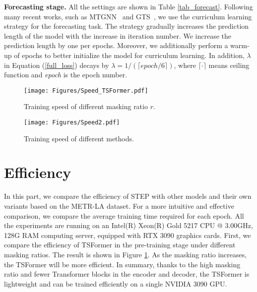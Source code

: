 \documentclass[sigconf]{acmart}
\begin{document}
\noindent \textbf{Forecasting stage.} 
All the settings are shown in Table \ref{tab_forecast}.
Following many recent works, such as MTGNN~\cite{2020MTGNN} and GTS~\cite{2021GTS}, we use the curriculum learning strategy for the forecasting task.
The strategy gradually increases the prediction length of the model with the increase in iteration number.
We increase the prediction length by one per  epochs.
Moreover, we additionally perform a warm-up of  epochs to better initialize the model for curriculum learning.
In addition, $\lambda$ in Equation (\ref{full_loss}) decays by $\lambda=1/(\lceil epoch/6 \rceil)$, where $\lceil \cdot \rceil$ means ceiling function and \textit{epoch} is the epoch number.



\begin{figure}[ht]
    \setlength{\abovecaptionskip}{0.2cm}
\centering
  \texttt{[image: Figures/Speed\_TSFormer.pdf]}
  \caption{Training speed of different masking ratio $r$.}
  \label{speed}
\end{figure}

\begin{figure}[ht]
    \setlength{\abovecaptionskip}{0.2cm}
\centering
  \texttt{[image: Figures/Speed2.pdf]}
  \caption{Training speed of different methods.}
  \label{speed2}
\end{figure}

\section{Efficiency}
\label{appendix_efficiency}
In this part, we compare the efficiency of STEP with other models and their own variants based on the METR-LA dataset.
For a more intuitive and effective comparison, we compare the average training time required for each epoch.
All the experiments are running on an Intel(R) Xeon(R) Gold 5217 CPU @ 3.00GHz, 128G RAM computing server, equipped with RTX 3090 graphics cards.
First, we compare the efficiency of TSFormer in the pre-training stage under different masking ratios.
The result is shown in Figure \ref{speed}.
As the masking ratio increases, the TSFormer will be more efficient.
In summary, thanks to the high masking ratio and fewer Transformer blocks in the encoder and decoder, the TSFormer is lightweight and can be trained efficiently on a single NVIDIA 3090 GPU.
\end{document}
